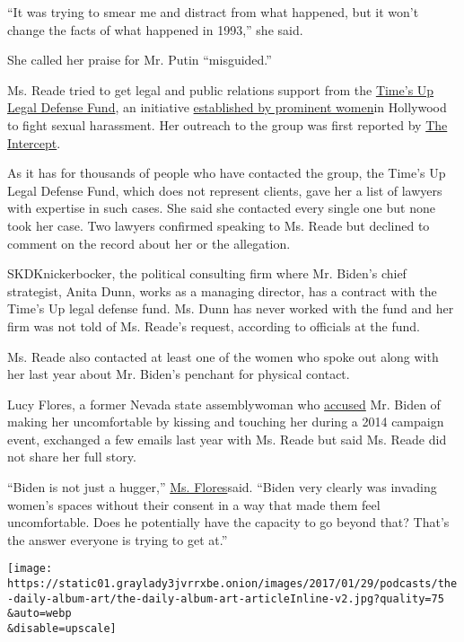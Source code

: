 ``It was trying to smear me and distract from what happened, but it
won't change the facts of what happened in 1993,'' she said.

She called her praise for Mr. Putin ``misguided.''

Ms. Reade tried to get legal and public relations support from the
\href{https://nwlc.org/times-up-legal-defense-fund/}{Time's Up Legal
Defense Fund}, an initiative
\href{https://www.nytimes3xbfgragh.onion/2018/01/01/movies/times-up-hollywood-women-sexual-harassment.html}{established
by prominent women}in Hollywood to fight sexual harassment. Her outreach
to the group was first reported by
\href{https://theintercept.com/2020/03/24/joe-biden-metoo-times-up/}{The
Intercept}.

As it has for thousands of people who have contacted the group, the
Time's Up Legal Defense Fund, which does not represent clients, gave her
a list of lawyers with expertise in such cases. She said she contacted
every single one but none took her case. Two lawyers confirmed speaking
to Ms. Reade but declined to comment on the record about her or the
allegation.

SKDKnickerbocker, the political consulting firm where Mr. Biden's chief
strategist, Anita Dunn, works as a managing director, has a contract
with the Time's Up legal defense fund. Ms. Dunn has never worked with
the fund and her firm was not told of Ms. Reade's request, according to
officials at the fund.

Ms. Reade also contacted at least one of the women who spoke out along
with her last year about Mr. Biden's penchant for physical contact.

Lucy Flores, a former Nevada state assemblywoman who
\href{https://www.thecut.com/2019/03/an-awkward-kiss-changed-how-i-saw-joe-biden.html}{accused}
Mr. Biden of making her uncomfortable by kissing and touching her during
a 2014 campaign event, exchanged a few emails last year with Ms. Reade
but said Ms. Reade did not share her full story.

``Biden is not just a hugger,''
\href{https://www.nytimes3xbfgragh.onion/2019/03/31/us/politics/lucy-flores-biden-accuser.html}{Ms.
Flores}said. ``Biden very clearly was invading women's spaces without
their consent in a way that made them feel uncomfortable. Does he
potentially have the capacity to go beyond that? That's the answer
everyone is trying to get at.''

\texttt{[image: https://static01.graylady3jvrrxbe.onion/images/2017/01/29/podcasts/the-daily-album-art/the-daily-album-art-articleInline-v2.jpg?quality=75\\\&auto=webp\\\&disable=upscale]}

